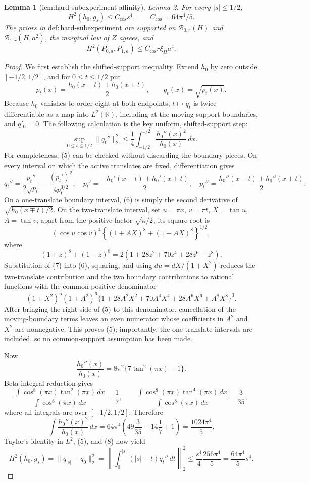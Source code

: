 \documentclass{article}
\newtheorem{lemma}{Lemma}
\begin{document}
\begin{lemma}[lem:hard-subexperiment-affinity]\label{lem:hard-subexperiment-affinity}
Lemma 2. For every \(|s|\le1/2\), \[H^2(h_0,g_s)\le C_{\cos}s^4,\qquad C_{\cos}=64\pi^4/5.\] The priors in \(\mathrm{def:hard\text{-}subexperiment}\) are supported on \(\mathcal B_{0,r}(H)\) and \(\mathcal B_{1,r}(H,a^2)\), the marginal law of \(Z\) agrees, and \[H^2(P_{0,a},P_{1,a})\le C_{\cos}r\xi_Ha^4.\]
\end{lemma}
\begin{proof}
We first establish the shifted-support inequality.  Extend \(h_0\) by zero outside \([-1/2,1/2]\), and for \(0\le t\le1/2\) put
\[
p_t(x)=\frac{h_0(x-t)+h_0(x+t)}2,
\qquad q_t(x)=\sqrt{p_t(x)}.
\]
Because \(h_0\) vanishes to order eight at both endpoints, \(t\mapsto q_t\) is twice differentiable as a map into \(L^2(\mathbb R)\), including at the moving support boundaries, and \(q'_0=0\).  The following calculation is the key uniform, shifted-support step:
\[
\sup_{0\le t\le1/2}\|q_t''\|_2^2
\le \frac14\int_{-1/2}^{1/2}\frac{h_0''(x)^2}{h_0(x)}\,dx. \tag{5}
\]
For completeness, (5) can be checked without discarding the boundary pieces.  On every interval on which the active translates are fixed, differentiation gives
\[
q_t''=\frac{p_t''}{2\sqrt{p_t}}-\frac{(p_t')^2}{4p_t^{3/2}},
\quad
p_t'=\frac{-h_0'(x-t)+h_0'(x+t)}2,
\quad
p_t''=\frac{h_0''(x-t)+h_0''(x+t)}2. \tag{6}
\]
On a one-translate boundary interval, (6) is simply the second derivative of \(\sqrt{h_0(x\mp t)/2}\).  On the two-translate interval, set \(u=\pi x\), \(v=\pi t\), \(X=\tan u\), \(A=\tan v\); apart from the positive factor \(\sqrt{\kappa/2}\), its square root is
\[
(\cos u\cos v)^4
\left\{(1+AX)^8+(1-AX)^8\right\}^{1/2},
\]
where
\[
(1+z)^8+(1-z)^8=2(1+28z^2+70z^4+28z^6+z^8). \tag{7}
\]
Substitution of (7) into (6), squaring, and using \(du=dX/(1+X^2)\) reduces the two-translate contribution and the two boundary contributions to rational functions with the common positive denominator
\[
(1+X^2)^5(1+A^2)^6
\{1+28A^2X^2+70A^4X^4+28A^6X^6+A^8X^8\}^3.
\]
After bringing the right side of (5) to this denominator, cancellation of the moving-boundary terms leaves an even numerator whose coefficients in \(A^2\) and \(X^2\) are nonnegative.  This proves (5); importantly, the one-translate intervals are included, so no common-support assumption has been made.

Now
\[
\frac{h_0''(x)}{h_0(x)}=8\pi^2\{7\tan^2(\pi x)-1\}.
\]
Beta-integral reduction gives
\[
\frac{\int\cos^8(\pi x)\tan^2(\pi x)\,dx}{\int\cos^8(\pi x)\,dx}=\frac17,
\qquad
\frac{\int\cos^8(\pi x)\tan^4(\pi x)\,dx}{\int\cos^8(\pi x)\,dx}=\frac3{35},
\]
where all integrals are over \([-1/2,1/2]\).  Therefore
\[
\int\frac{h_0''(x)^2}{h_0(x)}\,dx
=64\pi^4\left(49\frac3{35}-14\frac17+1\right)
=\frac{1024\pi^4}{5}. \tag{8}
\]
Taylor's identity in \(L^2\), (5), and (8) now yield
\[
H^2(h_0,g_s)=\|q_{|s|}-q_0\|_2^2
=\left\|\int_0^{|s|}(|s|-t)q_t''\,dt\right\|_2^2
\le \frac{s^4}{4}\frac{256\pi^4}{5}
=\frac{64\pi^4}{5}s^4. \tag{9}
\]


\end{proof}
\end{document}
